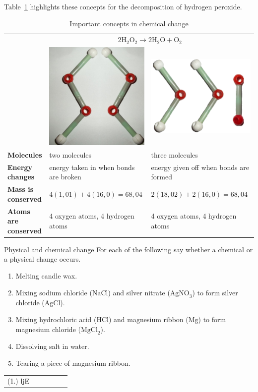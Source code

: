 Table~\ref{tab:chemchangeconcepts} highlights these concepts for the decomposition of hydrogen peroxide.
\begin{table}[H]
 \begin{center}
  \begin{tabular}{|l|l|l|} \hline
& \multicolumn{2}{|c|}{$2\text{H}_{2}\text{O}_{2} \rightarrow 2\text{H}_{2}\text{O} + \text{O}_{2}$} \\ 
& \includegraphics[width=.1\textwidth]{photos/H2O2_models.png} & \includegraphics[width=.1\textwidth]{photos/H2O_O2.png} \\ \hline
   \textbf{Molecules} & two molecules & three molecules \\ \hline
\textbf{Energy changes} & energy taken in when bonds are broken & energy given off when bonds are formed \\ \hline
\textbf{Mass is conserved} & $4(1,01) + 4(16,0) = 68,04$ & $2(18,02) + 2(16,0) = 68,04$ \\ \hline
\textbf{Atoms are conserved} & 4 oxygen atoms, 4 hydrogen atoms & 4 oxygen atoms, 4 hydrogen atoms \\ \hline
  \end{tabular}
 \end{center}
\caption{Important concepts in chemical change}
\label{tab:chemchangeconcepts}
\end{table}
\begin{exercises}{Physical and chemical change}
 For each of the following say whether a chemical or a physical change occurs.
\begin{enumerate}[noitemsep, label=\textbf{\arabic*}. ]
\item Melting candle wax.
\item Mixing sodium chloride ($\text{NaCl}$) and silver nitrate ($\text{AgNO}_3$) to form silver chloride ($\text{AgCl}$).
\item Mixing hydrochloric acid ($\text{HCl}$) and magnesium ribbon ($\text{Mg}$) to form magnesium chloride ($\text{MgCl}_{2}$).
\item Dissolving salt in water.
\item Tearing a piece of magnesium ribbon. 
\end{enumerate}
\practiceinfo
\par 
 \par \begin{tabular}[h]{cccccc}
 (1.) ljE  &    &   &   &    &   & \end{tabular}
\end{exercises}

